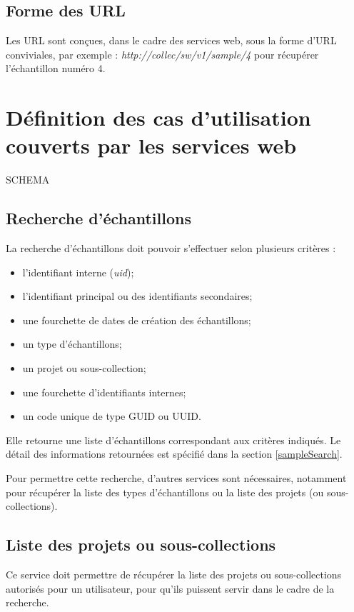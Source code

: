 \subsection{Forme des URL}
Les URL sont conçues, dans le cadre des services web, sous la forme d'URL conviviales, par exemple : \textit{http://collec/sw/v1/sample/4} pour récupérer l'échan\-tillon numéro 4.

\section{Définition des cas d'utilisation couverts par les services web}

SCHEMA

\subsection{Recherche d'échantillons}
La recherche d'échantillons doit pouvoir s'effectuer selon plusieurs critères :
\begin{itemize}
\item l'identifiant interne (\textit{uid});
\item l'identifiant principal ou des identifiants secondaires;
\item une fourchette de dates de création des échantillons;
\item un type d'échantillons;
\item un projet ou sous-collection;
\item une fourchette d'identifiants internes;
\item un code unique de type GUID ou UUID.
\end{itemize}

Elle retourne une liste d'échantillons correspondant aux critères indiqués. Le détail des informations retournées est spécifié dans la section \ref{sampleSearch}.

Pour permettre cette recherche, d'autres services sont nécessaires, notamment pour récupérer la liste des types d'échantillons ou la liste des projets (ou sous-collections).

\subsection{Liste des projets ou sous-collections}
Ce service doit permettre de récupérer la liste des projets ou sous-collections autorisés pour un utilisateur, pour qu'ils puissent servir dans le cadre de la recherche.

